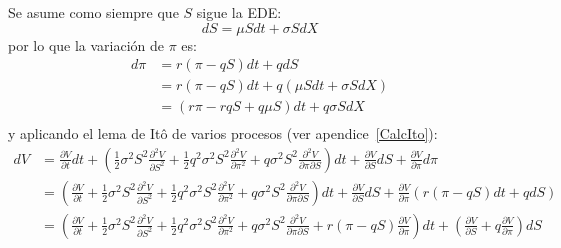 Se asume como siempre que $S$ sigue la EDE:\@
\begin{equation*}
    dS = \mu S dt + \sigma S dX
\end{equation*}
por lo que la variación de $\pi$ es:
\begin{align*}
    d\pi &= r(\pi - q S)dt + q dS \\
    &= r(\pi - q S)dt + q(\mu S dt + \sigma S dX) \\
    &= (r\pi - rq S + q\mu S)dt + q\sigma S dX \\
\end{align*}
y aplicando el lema de Itô de varios procesos (ver apendice~\ref{CalcIto}):
\begin{align*}
    dV &= \frac{\partial V}{\partial t}dt + \left( \frac{1}{2}\sigma^2 S^2 \frac{\partial^2 V}{\partial S^2} + \frac{1}{2}q^2\sigma^2 S^2 \frac{\partial^2 V}{\partial \pi^2} + q\sigma^2 S^2 \frac{\partial^2 V}{\partial \pi \partial S} \right)dt + \frac{\partial V}{\partial S}dS + \frac{\partial V}{\partial \pi}d\pi \\
    &= \left( \frac{\partial V}{\partial t} + \frac{1}{2}\sigma^2 S^2 \frac{\partial^2 V}{\partial S^2} + \frac{1}{2}q^2\sigma^2 S^2 \frac{\partial^2 V}{\partial \pi^2} + q\sigma^2 S^2 \frac{\partial^2 V}{\partial \pi \partial S} \right)dt + \frac{\partial V}{\partial S}dS + \frac{\partial V}{\partial \pi}\left(r(\pi - q S)dt + q dS\right) \\
    &= \left( \frac{\partial V}{\partial t} + \frac{1}{2}\sigma^2 S^2 \frac{\partial^2 V}{\partial S^2} + \frac{1}{2}q^2\sigma^2 S^2 \frac{\partial^2 V}{\partial \pi^2} + q\sigma^2 S^2 \frac{\partial^2 V}{\partial \pi \partial S} + r(\pi - q S)\frac{\partial V}{\partial \pi} \right)dt + \left( \frac{\partial V}{\partial S} + q\frac{\partial V}{\partial \pi} \right)dS
\end{align*}

